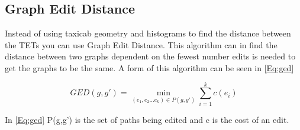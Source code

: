 \subsection{Graph Edit Distance}
Instead of using taxicab geometry and histograms to find the distance between the TETs you can use Graph Edit Distance. This algorithm can in find the distance between two graphs dependent on the fewest number edits is needed to get the graphs to be the same. A form of this algorithm can be seen in \autoref{Eq:ged}

\begin{equation}\label{Eq:ged}
 GED(g,g') = \min_{(e_1,e_2 \dots e_k) \in P(g, g') } \sum_{i=1}^k c(e_i)
\end{equation}

In \autoref{Eq:ged} P(g,g') is the set of paths being edited and c is the cost of an edit. 